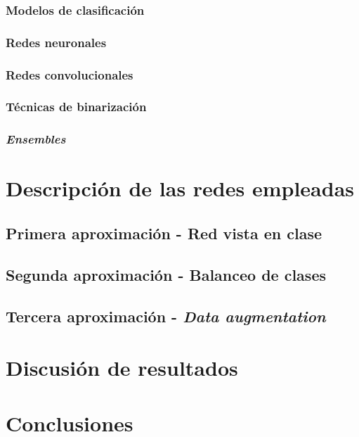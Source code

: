 \documentclass[]{scrartcl}
\begin{document}
		\subsubsection{Modelos de clasificación}
		
		\subsubsection{Redes neuronales}
		
		\subsubsection{Redes convolucionales}
		
		\subsubsection{Técnicas de binarización}
		
		\subsubsection{\textit{Ensembles}}

\section{Descripción de las redes empleadas}

	\subsection{Primera aproximación - Red vista en clase}
	
	\subsection{Segunda aproximación - Balanceo de clases}
	
	\subsection{Tercera aproximación - \textit{Data augmentation}}
	
\section{Discusión de resultados}

\section{Conclusiones}



\end{document}
